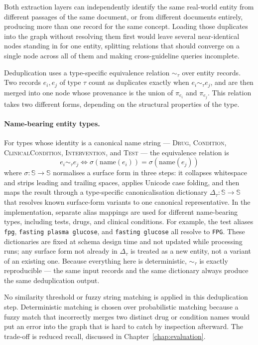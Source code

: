 Both extraction layers can independently identify the same real-world entity from different passages of the same document, or from different documents entirely, producing more than one record for the same concept. Loading those duplicates into the graph without resolving them first would leave several near-identical nodes standing in for one entity, splitting relations that should converge on a single node across all of them and making cross-guideline queries incomplete.

Deduplication uses a type-specific equivalence relation $\sim_\tau$ over entity records. Two records $e_i, e_j$ of type $\tau$ count as duplicates exactly when $e_i \sim_\tau e_j$, and are then merged into one node whose provenance is the union of $\pi_{e_i}$ and $\pi_{e_j}$. This relation takes two different forms, depending on the structural properties of the type.

\paragraph{Name-bearing entity types.}
For types whose identity is a canonical name string --- \textsc{Drug}, \textsc{Condition}, \textsc{ClinicalCondition}, \textsc{Intervention}, and \textsc{Test} --- the equivalence relation is
$$e_i \sim_\tau e_j \iff \sigma(\text{name}(e_i)) = \sigma(\text{name}(e_j))$$
where $\sigma: \mathbb{S} \rightarrow \mathbb{S}$ normalises a surface form in three steps: it collapses whitespace and strips leading and trailing spaces, applies Unicode case folding, and then maps the result through a type-specific canonicalisation dictionary $\Delta_\tau: \mathbb{S} \rightarrow \mathbb{S}$ that resolves known surface-form variants to one canonical representative. In the implementation, separate alias mappings are used for different
name-bearing types, including tests, drugs, and clinical conditions.
For example, the test aliases \texttt{fpg},
\texttt{fasting plasma glucose}, and \texttt{fasting glucose} all
resolve to \texttt{FPG}. These dictionaries are fixed at schema design time and not updated while processing runs; any surface form not already in $\Delta_\tau$ is treated as a new entity, not a variant of an existing one. Because everything here is deterministic, $\sim_\tau$ is exactly reproducible --- the same input records and the same dictionary always produce the same deduplication output.

No similarity threshold or fuzzy string matching is applied in this
deduplication step. Deterministic matching is chosen over probabilistic matching because a fuzzy match that incorrectly merges two distinct drug or condition names would put an error into the graph that is hard to catch by inspection afterward. The trade-off is reduced recall, discussed in Chapter~\ref{chap:evaluation}.

